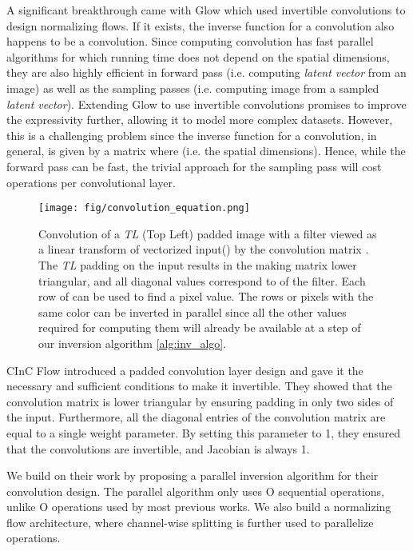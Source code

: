 \documentclass[a4paper,twoside]{article}
\theoremstyle{definition}
\begin{document}
A significant breakthrough came with Glow \citep{kingma2018glow} which used  invertible convolutions to design normalizing flows. If it exists, the inverse function for a  convolution also happens to be a  convolution. Since computing  convolution has fast parallel algorithms for which running time does not depend on the spatial dimensions, they are also highly efficient in forward pass (i.e. computing \emph{latent vector} from an image) as well as the sampling passes (i.e. computing image from a sampled \emph{latent vector}). Extending Glow to use invertible  convolutions promises to improve the expressivity further, allowing it to model more complex datasets. However, this is a challenging problem since the inverse function for a  convolution, in general, is given by a  matrix where  (i.e. the spatial dimensions). Hence, while the forward pass can be fast, the trivial approach for the sampling pass will cost  operations per convolutional layer.


\begin{figure*}[!th]
    \centering
    \texttt{[image: fig/convolution\_equation.png]}
    \caption{Convolution of a  \emph{TL} (Top Left) padded image with a  filter viewed as a linear transform of vectorized input() by the convolution matrix . The \emph{TL} padding on the input results in the making matrix  lower triangular, and all diagonal values correspond to  of the filter. Each row of  can be used to find a pixel value. The rows or pixels with the same color can be inverted in parallel since all the other values required for computing them will already be available at a step of our inversion algorithm \ref{alg:inv_algo}.}
    \label{fig:Conv_equn}
\end{figure*}



CInC Flow \citep{nagar2021cinc} introduced a padded  convolution layer design and gave it the necessary and sufficient conditions to make it invertible. They showed that the convolution matrix is lower triangular by ensuring padding in only two sides of the input. Furthermore, all the diagonal entries of the convolution matrix are equal to a single weight parameter. By setting this parameter to 1, they ensured that the convolutions are invertible, and Jacobian is always 1.

We build on their work by proposing a parallel inversion algorithm for their convolution design. The parallel algorithm only uses  O sequential operations, unlike O operations used by most previous works. We also build a normalizing flow architecture, where channel-wise splitting is further used to parallelize operations.
\end{document}

